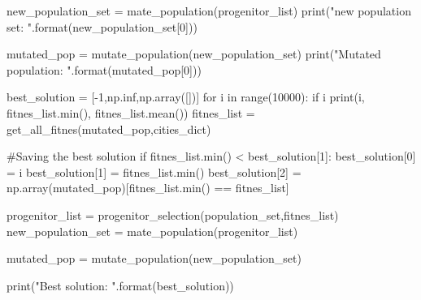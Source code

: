 \documentclass[14pt, a4paper]{article}
\theoremstyle{sltheorem}
\theoremstyle{soltheorem}
\begin{document}
\begin{python}
    new_population_set = mate_population(progenitor_list)
    print("new population set: {}".format(new_population_set[0]))

    mutated_pop = mutate_population(new_population_set)
    print("Mutated population: {}".format(mutated_pop[0]))

    best_solution = [-1,np.inf,np.array([])]
    for i in range(10000):
        if i %
            print(i, fitnes_list.min(), fitnes_list.mean())
        fitnes_list = get_all_fitnes(mutated_pop,cities_dict)
        
        #Saving the best solution
        if fitnes_list.min() < best_solution[1]:
            best_solution[0] = i
            best_solution[1] = fitnes_list.min()
            best_solution[2] = np.array(mutated_pop)[fitnes_list.min() == fitnes_list]
        
        progenitor_list = progenitor_selection(population_set,fitnes_list)
        new_population_set = mate_population(progenitor_list)
        
        mutated_pop = mutate_population(new_population_set)
    
    print("Best solution: {}".format(best_solution))
\end{python}
\end{document}
